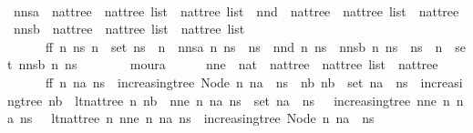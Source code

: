 \begin{isabellebody}
\ \isamarkupfalse%
\ nnsa\ {\isacharcolon}{\isacharcolon}\ {\isachardoublequoteopen}nattree\ {\isasymRightarrow}\ nattree\ list\ {\isasymRightarrow}\ nattree\ list{\isachardoublequoteclose}\ \ nnd\ {\isacharcolon}{\isacharcolon}\ {\isachardoublequoteopen}nattree\ {\isasymRightarrow}\ nattree\ list\ {\isasymRightarrow}\ nattree{\isachardoublequoteclose}\ \ nnsb\ {\isacharcolon}{\isacharcolon}\ {\isachardoublequoteopen}nattree\ {\isasymRightarrow}\ nattree\ list\ {\isasymRightarrow}\ nattree\ list{\isachardoublequoteclose}\ \isanewline
\ \ \ \ \ \ ff{}{\isacharcolon}\ {\isachardoublequoteopen}{\isasymforall}n\ ns{\isachardot}\ n\ {\isasymnotin}\ set\ ns\ {\isasymor}\ n\ {\isacharhash}\ nnsa\ n\ ns\ {\isacharequal}\ ns\ {\isasymor}\ nnd\ n\ ns\ {\isacharhash}\ nnsb\ n\ ns\ {\isacharequal}\ ns\ {\isasymand}\ n\ {\isasymin}\ set\ {\isacharparenleft}nnsb\ n\ ns{\isacharparenright}{\isachardoublequoteclose}\isanewline
\ \ \ \ \ \ \isamarkupfalse%
\ moura\isanewline
\ \ \ \ \isamarkupfalse%
\ nne\ {\isacharcolon}{\isacharcolon}\ {\isachardoublequoteopen}nat\ {\isasymRightarrow}\ nattree\ {\isasymRightarrow}\ nattree\ list\ {\isasymRightarrow}\ nattree{\isachardoublequoteclose}\ \isanewline
\ \ \ \ \ \ ff{}{\isacharcolon}\ {\isachardoublequoteopen}{\isasymforall}n\ na\ ns{\isachardot}\ {\isacharparenleft}{\isasymnot}\ increasing{\isacharunderscore}tree\ {\isacharparenleft}Node\ n\ {\isacharparenleft}na\ {\isacharhash}\ ns{\isacharparenright}{\isacharparenright}\ {\isasymor}\ {\isacharparenleft}{\isasymforall}nb{\isachardot}\ nb\ {\isasymnotin}\ set\ {\isacharparenleft}na\ {\isacharhash}\ ns{\isacharparenright}\ {\isasymor}\ increasing{\isacharunderscore}tree\ nb\ {\isasymand}\ lt{\isacharunderscore}nat{\isacharunderscore}tree\ n\ nb{\isacharparenright}{\isacharparenright}\ {\isasymand}\ {\isacharparenleft}nne\ n\ na\ ns\ {\isasymin}\ set\ {\isacharparenleft}na\ {\isacharhash}\ ns{\isacharparenright}\ {\isasymand}\ {\isacharparenleft}{\isasymnot}\ increasing{\isacharunderscore}tree\ {\isacharparenleft}nne\ n\ na\ ns{\isacharparenright}\ {\isasymor}\ {\isasymnot}\ lt{\isacharunderscore}nat{\isacharunderscore}tree\ n\ {\isacharparenleft}nne\ n\ na\ ns{\isacharparenright}{\isacharparenright}\ {\isasymor}\ increasing{\isacharunderscore}tree\ {\isacharparenleft}Node\ n\ {\isacharparenleft}na\ {\isacharhash}\ ns{\isacharparenright}{\isacharparenright}{\isacharparenright}{\isachardoublequoteclose}\isanewline
\ \ \ \ \ \ \isamarkupfalse%

\end{isabellebody}
